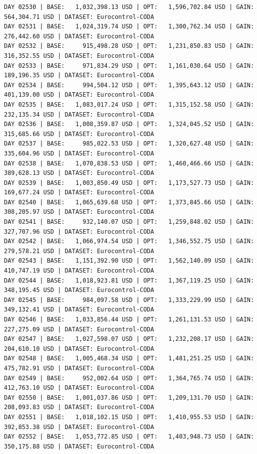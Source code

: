 \documentclass[11pt,a4paper]{article}
\begin{document}
\begin{verbatim}
DAY 02530 | BASE:   1,032,398.13 USD | OPT:   1,596,702.84 USD | GAIN: 564,304.71 USD | DATASET: Eurocontrol-CODA
DAY 02531 | BASE:   1,024,319.74 USD | OPT:   1,300,762.34 USD | GAIN: 276,442.60 USD | DATASET: Eurocontrol-CODA
DAY 02532 | BASE:     915,498.28 USD | OPT:   1,231,850.83 USD | GAIN: 316,352.55 USD | DATASET: Eurocontrol-CODA
DAY 02533 | BASE:     971,834.29 USD | OPT:   1,161,030.64 USD | GAIN: 189,196.35 USD | DATASET: Eurocontrol-CODA
DAY 02534 | BASE:     994,504.12 USD | OPT:   1,395,643.12 USD | GAIN: 401,139.00 USD | DATASET: Eurocontrol-CODA
DAY 02535 | BASE:   1,083,017.24 USD | OPT:   1,315,152.58 USD | GAIN: 232,135.34 USD | DATASET: Eurocontrol-CODA
DAY 02536 | BASE:   1,008,359.87 USD | OPT:   1,324,045.52 USD | GAIN: 315,685.66 USD | DATASET: Eurocontrol-CODA
DAY 02537 | BASE:     985,022.53 USD | OPT:   1,320,627.48 USD | GAIN: 335,604.96 USD | DATASET: Eurocontrol-CODA
DAY 02538 | BASE:   1,070,838.53 USD | OPT:   1,460,466.66 USD | GAIN: 389,628.13 USD | DATASET: Eurocontrol-CODA
DAY 02539 | BASE:   1,003,850.49 USD | OPT:   1,173,527.73 USD | GAIN: 169,677.24 USD | DATASET: Eurocontrol-CODA
DAY 02540 | BASE:   1,065,639.68 USD | OPT:   1,373,845.66 USD | GAIN: 308,205.97 USD | DATASET: Eurocontrol-CODA
DAY 02541 | BASE:     932,140.07 USD | OPT:   1,259,848.02 USD | GAIN: 327,707.96 USD | DATASET: Eurocontrol-CODA
DAY 02542 | BASE:   1,066,974.54 USD | OPT:   1,346,552.75 USD | GAIN: 279,578.21 USD | DATASET: Eurocontrol-CODA
DAY 02543 | BASE:   1,151,392.90 USD | OPT:   1,562,140.09 USD | GAIN: 410,747.19 USD | DATASET: Eurocontrol-CODA
DAY 02544 | BASE:   1,018,923.81 USD | OPT:   1,367,119.25 USD | GAIN: 348,195.45 USD | DATASET: Eurocontrol-CODA
DAY 02545 | BASE:     984,097.58 USD | OPT:   1,333,229.99 USD | GAIN: 349,132.41 USD | DATASET: Eurocontrol-CODA
DAY 02546 | BASE:   1,033,856.44 USD | OPT:   1,261,131.53 USD | GAIN: 227,275.09 USD | DATASET: Eurocontrol-CODA
DAY 02547 | BASE:   1,027,598.07 USD | OPT:   1,232,208.17 USD | GAIN: 204,610.10 USD | DATASET: Eurocontrol-CODA
DAY 02548 | BASE:   1,005,468.34 USD | OPT:   1,481,251.25 USD | GAIN: 475,782.91 USD | DATASET: Eurocontrol-CODA
DAY 02549 | BASE:     952,002.64 USD | OPT:   1,364,765.74 USD | GAIN: 412,763.10 USD | DATASET: Eurocontrol-CODA
DAY 02550 | BASE:   1,001,037.86 USD | OPT:   1,209,131.70 USD | GAIN: 208,093.83 USD | DATASET: Eurocontrol-CODA
DAY 02551 | BASE:   1,018,102.15 USD | OPT:   1,410,955.53 USD | GAIN: 392,853.38 USD | DATASET: Eurocontrol-CODA
DAY 02552 | BASE:   1,053,772.85 USD | OPT:   1,403,948.73 USD | GAIN: 350,175.88 USD | DATASET: Eurocontrol-CODA

\end{verbatim}
\end{document}
